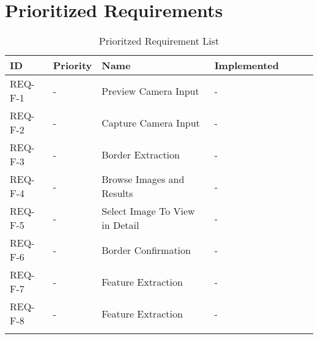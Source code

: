 \section{Prioritized Requirements}

\begin{longtable}{ | l | l | l | l | l | l | l |}
\hline
ID & Priority & Name & Implemented  \\ \hline

REQ-F-1 & - & Preview Camera Input & -  \\ \hline
REQ-F-2 & - & Capture Camera Input & -  \\ \hline
REQ-F-3 & - & Border Extraction & -  \\ \hline
REQ-F-4 & - & Browse Images and Results & -  \\ \hline
REQ-F-5 & - & Select Image To View in Detail & -  \\ \hline
REQ-F-6 & - & Border Confirmation & -  \\ \hline
REQ-F-7 & - & Feature Extraction & -  \\ \hline
REQ-F-8 & - & Feature Extraction & -  \\ \hline


\caption{Prioritzed Requirement List}
\label{fig:prio_req}
\end{longtable}
